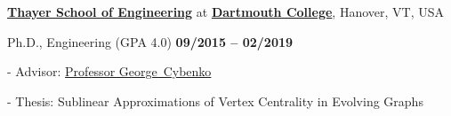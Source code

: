 \href{https://engineering.dartmouth.edu/}{\textbf{Thayer School of Engineering}}
at 
\href{https://dartmouth.edu}{\textbf{Dartmouth College}},
Hanover, VT, USA
\vspace{-0.5em}
\begin{outerlist}

\item[] Ph.D.,
             Engineering (GPA 4.0)
\hfill \textbf{09/2015 -- 02/2019}

\vspace{-0.25em}
        \begin{innerlist}
        \item[-] Advisor:
              \href{http://www.dartmouth.edu/~gvc/}
                   {Professor George~Cybenko}
        \item[-] Thesis: Sublinear Approximations of Vertex Centrality in Evolving Graphs
        \end{innerlist}
\end{outerlist}

\vspace{0.5em}


